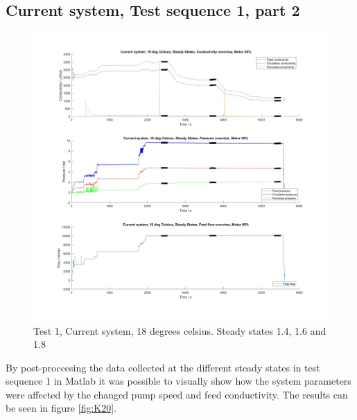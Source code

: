 \newpage

\subsection{Current system, Test sequence 1, part 2}
  
\begin{figure}[H]
    \centering
    \includegraphics[width=1\textwidth]{overview20_80}
    \caption{Test 1, Current system, 18 degrees celsius. Steady states 1.4, 1.6 and 1.8}
    \label{fig:SteadyStates20C_2}
\end{figure}

\newpage

By post-proccesing the data collected at the different steady states in test sequence 1 in Matlab it was possible to visually show how the system parameters were affected by the changed pump speed and feed conductivity. The results can be seen in figure \ref{fig:K20}.  


